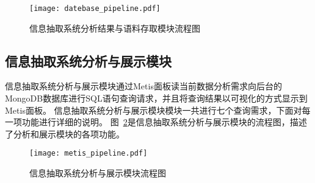 \begin{figure}[h]
  \centering
  \texttt{[image: datebase\_pipeline.pdf]}
  \caption{信息抽取系统分析结果与语料存取模块流程图}
  \label{fig:datebase_pipeline}
\end{figure}

\subsection{信息抽取系统分析与展示模块}

信息抽取系统分析与展示模块通过Metis面板读当前数据分析需求向后台的MongoDB数据库进行SQL语句查询请求，并且将查询结果以可视化的方式显示到Metis面板。
信息抽取系统分析与展示模块模块一共进行七个查询需求，下面对每一项功能进行详细的说明。
图~\ref{fig:metis_pipeline}是信息抽取系统分析与展示模块的流程图，描述了分析和展示模块的各项功能。

\begin{figure}[h]
  \centering
  \texttt{[image: metis\_pipeline.pdf]}
  \caption{信息抽取系统分析与展示模块流程图}
  \label{fig:metis_pipeline}
\end{figure}

